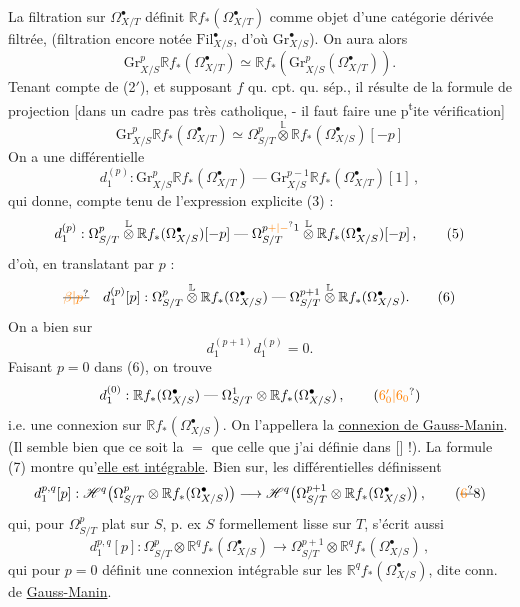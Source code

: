 La filtration sur $\Omega^\bullet_{X/T}$ définit $\mathbb R f_*(\Omega^\bullet_{X/T})$ comme objet d'une catégorie dérivée filtrée, (filtration encore notée $\mathrm{Fil}^\bullet_{X/S}$, d'où $\mathrm{Gr}^\bullet_{X/S}$). On
aura alors
\[
 \mathrm{Gr}^p_{X/S}\mathbb R f_*(\Omega^\bullet_{X/T})\simeq\mathbb R f_*(\mathrm{Gr}^p_{X/S}(\Omega^\bullet_{X/T})) .
\]
Tenant compte de (2$'$), et supposant $f$ qu. cpt. qu. sép., il résulte  de la formule de projection [dans un cadre pas très catholique, - il faut faire une p\textsuperscript{t}ite vérification]
\[
 \mathrm{Gr}^p_{X/S}\mathbb R f_*(\Omega^\bullet_{X/T})\simeq\Omega^p_{S/T}\overset{\mathbb L}{\otimes}\mathbb R f_*(\Omega^\bullet_{X/S})[-p] \tag*{(3)}
\]
On a  une différentielle
\[
 d_1^{(p)}:\mathrm{Gr}^p_{X/S}\mathbb R f_*(\Omega^\bullet_{X/T})\mathrel{\text{---}}\mathrm{Gr}^{p-1}_{X/S}\mathbb R f_*(\Omega^\bullet_{X/T})[1] \,, \tag*{(4)}
\]
qui donne, compte tenu de l'expression explicite (3) :
\[
 d_1^{(p)}:\Omega^p_{S/T}\overset{\mathbb L}{\otimes}\mathbb R f_*(\Omega^\bullet_{X/S})[-p]\mathrel{\text{---}}\Omega^{p\unsure{+|-}1}_{S/T}\overset{\mathbb L}{\otimes}\mathbb R f_*(\Omega^\bullet_{X/S})[-p] \,, \tag*{(5)}
\]
d'où, en translatant par $p$ :
\[
 \deleted{\unsure{\beta|p}}\quad d_1^{(p)}[p]:\Omega^p_{S/T}\overset{\mathbb L}{\otimes}\mathbb R f_*(\Omega^\bullet_{X/S})\mathrel{\text{---}}\Omega^{p+1}_{S/T}\overset{\mathbb L}{\otimes}\mathbb R f_*(\Omega^\bullet_{X/S}). \tag*{(6)}
\]
On a bien sur
\[
 d_1^{(p+1)}d_1^{(p)}=0 . \tag*{(7)}
\]
Faisant $p=0$ dans (6), on trouve
\[
 d_1^{(0)}:\mathbb R f_*(\Omega^\bullet_{X/S})\mathrel{\text{---}}\Omega^1_{S/T}\otimes\mathbb R f_*(\Omega^\bullet_{X/S}) \,, \tag*{$(\unsure{6_0'|6_0})$}
\]
i.e. une connexion sur $\mathbb R f_*(\Omega^\bullet_{X/S})$.  On l'appellera la \uline{connexion de Gauss-Manin}. (Il semble bien que ce soit la $=$ que celle que j'ai définie dans [\enspace] !). La formule (7) montre qu'\uline{elle est intégrable}.
 Bien sur, les différentielles  définissent
\[
 d_1^{p,q}[p]:\mathscr H^q\bigl(\Omega^p_{S/T}\otimes\mathbb R f_*(\Omega^\bullet_{X/S})\bigr)\longrightarrow
 \mathscr H^q\bigl(\Omega^{p+1}_{S/T}\otimes\mathbb R f_*(\Omega^\bullet_{X/S})\bigr) \,, \tag*{(\deleted{\unsure{6}}8)}
\]
qui, pour $\Omega^p_{S/T}$ plat sur $S$, p. ex $S$ formellement lisse sur $T$,  s'écrit aussi
\[
 d_1^{p,q}[p]:\Omega^p_{S/T}\otimes\mathbb R^q f_*(\Omega^\bullet_{X/S})\longrightarrow
 \Omega^{p+1}_{S/T}\otimes\mathbb R^q f_*(\Omega^\bullet_{X/S}) \,, \tag*{(8$'$)}
\]
qui pour $p=0$ définit une connexion intégrable sur les $\mathbb R^q f_*(\Omega^\bullet_{X/S})$, dite conn. de \uline{Gauss-Manin}.


